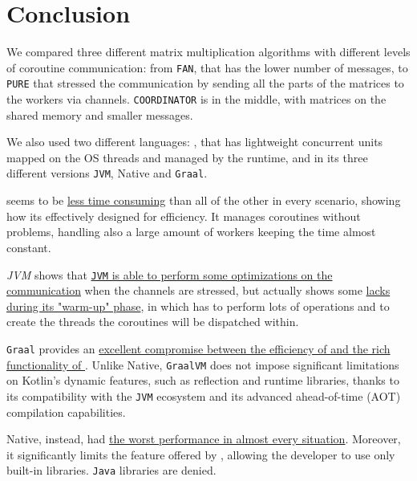 \section{Conclusion}

We compared three different matrix multiplication algorithms with different levels of coroutine communication: from \texttt{FAN}, that has the lower number of messages, to \texttt{PURE} that stressed the communication by sending all the parts of the matrices to the workers via channels. \texttt{COORDINATOR} is in the middle, with matrices on the shared memory and smaller messages.

We also used two different languages: \Go, that has lightweight concurrent units mapped on the OS threads and managed by the \Go runtime, and \Kotlin in its three different versions \texttt{JVM}, Native and \texttt{Graal}.

\Go seems to be \uline{less time consuming} than all of the other in every scenario, showing how its effectively designed for efficiency. It manages coroutines without problems, handling also a large amount of workers keeping the time almost constant.

\Kotlin \textit{JVM} shows that \uline{\texttt{JVM} is able to perform some optimizations on the communication} when the channels are stressed, but actually shows some \uline{lacks during its "warm-up" phase}, in which has to perform lots of operations and to create the threads the coroutines will be dispatched within.

\Kotlin \texttt{Graal} provides an \uline{excellent compromise between the efficiency of \Go and the rich functionality of \Kotlin}. Unlike \Kotlin Native, \texttt{GraalVM} does not impose significant limitations on Kotlin's dynamic features, such as reflection and runtime libraries, thanks to its compatibility with the \texttt{JVM} ecosystem and its advanced ahead-of-time (AOT) compilation capabilities.

\Kotlin Native, instead, had \uline{the worst performance in almost every situation}. Moreover, it significantly limits the feature offered by \Kotlin, allowing the developer to use only built-in \Kotlin libraries. \texttt{Java} libraries are denied.